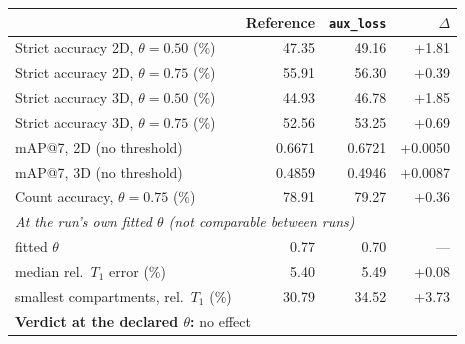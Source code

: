 \renewcommand{\arraystretch}{1.05}
\begin{tabular}{lrrr}
\toprule
 & Reference & \texttt{aux\_loss} & $\Delta$ \\
\midrule
Strict accuracy 2D, $\theta = 0.50$ (\%) & 47.35 & 49.16 & +1.81 \\
Strict accuracy 2D, $\theta = 0.75$ (\%) & 55.91 & 56.30 & +0.39 \\
Strict accuracy 3D, $\theta = 0.50$ (\%) & 44.93 & 46.78 & +1.85 \\
Strict accuracy 3D, $\theta = 0.75$ (\%) & 52.56 & 53.25 & +0.69 \\
\midrule
mAP@7, 2D (no threshold) & 0.6671 & 0.6721 & +0.0050 \\
mAP@7, 3D (no threshold) & 0.4859 & 0.4946 & +0.0087 \\
\midrule
Count accuracy, $\theta = 0.75$ (\%) & 78.91 & 79.27 & +0.36 \\
\midrule
\multicolumn{4}{l}{\emph{At the run's own fitted $\theta$ (not comparable between runs)}} \\
\quad fitted $\theta$ & 0.77 & 0.70 & --- \\
\quad median rel.\ $T_1$ error (\%) & 5.40 & 5.49 & +0.08 \\
\quad smallest compartments, rel.\ $T_1$ (\%) & 30.79 & 34.52 & +3.73 \\
\midrule
\multicolumn{4}{l}{\textbf{Verdict at the declared $\theta$:} no effect} \\
\bottomrule
\end{tabular}
